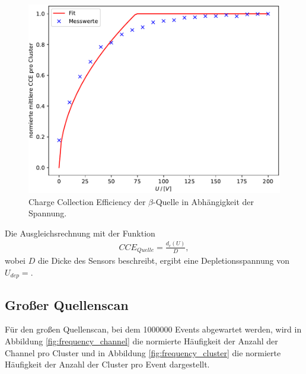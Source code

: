 \begin{figure}[H]
  \centering
  \includegraphics{build/CCEQ_fit.pdf}
  \caption{Charge Collection Efficiency der $\beta$-Quelle in Abhängigkeit der Spannung.}
  \label{fig:CEEQ_fit}
\end{figure}

Die Ausgleichsrechnung mit der Funktion
\begin{align}
	CCE_{Quelle} = \frac{d_c(U)}{D},
\end{align} 
wobei $D$ die Dicke des Sensors beschreibt, ergibt eine Depletionsspannung von $U_{dep} = $.

\subsection{Großer Quellenscan}
Für den großen Quellenscan, bei dem 1000000 Events abgewartet werden, wird in Abbildung \ref{fig:frequency_channel} die normierte Häufigkeit der Anzahl der Channel pro Cluster und in Abbildung \ref{fig:frequency_cluster} die normierte Häufigkeit der Anzahl der Cluster pro Event dargestellt.

